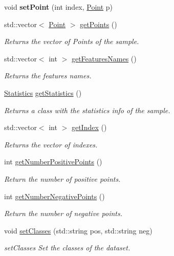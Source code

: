\begin{DoxyCompactItemize}
\mbox{\label{class_data_a9f34656f179b152407d51b04aab70748}} 
void {\bfseries set\+Point} (int index, \hyperlink{class_point}{Point} p)
\item 
std\+::vector$<$ \hyperlink{class_point}{Point} $>$ \hyperlink{class_data_a8fe9ce813848765a7615b909c4654b55}{get\+Points} ()
\begin{DoxyCompactList}\small\item\em Returns the vector of Points of the sample. \end{DoxyCompactList}\item 
std\+::vector$<$ int $>$ \hyperlink{class_data_a2f6399baee6535e7f48250da54fbf00d}{get\+Features\+Names} ()
\begin{DoxyCompactList}\small\item\em Returns the features names. \end{DoxyCompactList}\item 
\hyperlink{class_statistics}{Statistics} \hyperlink{class_data_a26376768a100f1999ef3ac15a2aa2a67}{get\+Statistics} ()
\begin{DoxyCompactList}\small\item\em Returns a class with the statistics info of the sample. \end{DoxyCompactList}\item 
std\+::vector$<$ int $>$ \hyperlink{class_data_a16685ae631c5bedc22c974980bc74c05}{get\+Index} ()
\begin{DoxyCompactList}\small\item\em Returns the vector of indexes. \end{DoxyCompactList}\item 
int \hyperlink{class_data_a45a39ab2144bcdd0ac1aa67d7d08a6cc}{get\+Number\+Positive\+Points} ()
\begin{DoxyCompactList}\small\item\em Return the number of positive points. \end{DoxyCompactList}\item 
int \hyperlink{class_data_a5166e74e946c2dbac75f383d63f018ea}{get\+Number\+Negative\+Points} ()
\begin{DoxyCompactList}\small\item\em Return the number of negative points. \end{DoxyCompactList}\item 
void \hyperlink{class_data_a6dd8a8a1e1659c76e5716fc8a23a86e2}{set\+Classes} (std\+::string pos, std\+::string neg)
\begin{DoxyCompactList}\small\item\em set\+Classes Set the classes of the dataset. \end{DoxyCompactList}\item 

\end{DoxyCompactItemize}
